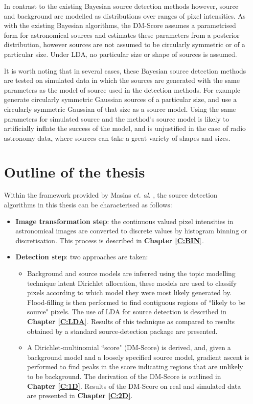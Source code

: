 In contrast to the existing Bayesian source detection methods however, source and background are modelled as distributions over ranges of pixel intensities. As with the existing Bayesian algorithms, the DM-Score assumes a parametrised form for astronomical sources and estimates these parameters from a posterior distribution, however sources are not assumed to be circularly symmetric or of a particular size. Under LDA, no particular size or shape of sources is assumed.

It is worth noting that in several cases, these Bayesian source detection methods are tested on simulated data in which the sources are generated with the same parameters as the model of source used in the detection methods. For example \cite{feroz2008multimodal,hobson2003bayesian,savage2007bayesian} generate circularly symmetric Gaussian sources of a particular size, and use a circularly symmetric Gaussian of that size as a source model. Using the same parameters for simulated source and the method's source model is likely to artificially inflate the success of the model, and is unjustified in the case of radio astronomy data, where sources can take a great variety of shapes and sizes.

\section{Outline of the thesis}

Within the framework provided by Masias \emph{et. al.} \cite{masias2012review}, the source detection algorithms in this thesis can be characterised as follows:
\begin{itemize}
\item \textbf{Image transformation step}: the continuous valued pixel intensities in astronomical images are converted to discrete values by histogram binning or discretisation. This process is described in \textbf{Chapter \ref{C:BIN}}.
\item \textbf{Detection step}: two approaches are taken:
    \begin{itemize}
    \item Background and source models are inferred using the topic modelling technique latent Dirichlet allocation, these models are used to classify pixels according to which model they were most likely generated by. Flood-filling is then performed to find contiguous regions of ``likely to be source" pixels. The use of LDA for source detection is described in \textbf{Chapter \ref{C:LDA}}. Results of this technique as compared to results obtained by a standard source-detection package are presented.
    \item A Dirichlet-multinomial ``score" (DM-Score) is derived, and, given a background model and a loosely specified source model, gradient ascent is performed to find peaks in the score indicating regions that are unlikely to be background. The derivation of the DM-Score is outlined in \textbf{Chapter \ref{C:1D}}. Results of the DM-Score on real and simulated data are presented in  \textbf{Chapter \ref{C:2D}}.
\end{itemize} 
\end{itemize} 

